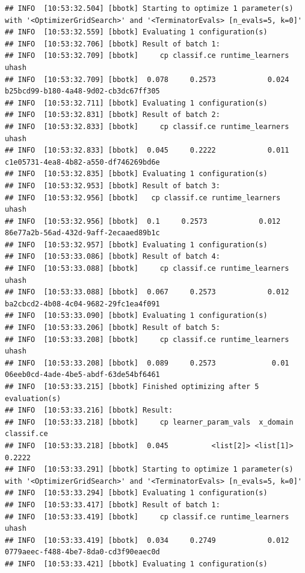 \documentclass[
]{scrbook}
\begin{document}
\begin{verbatim}
## INFO  [10:53:32.504] [bbotk] Starting to optimize 1 parameter(s) with '<OptimizerGridSearch>' and '<TerminatorEvals> [n_evals=5, k=0]' 
## INFO  [10:53:32.559] [bbotk] Evaluating 1 configuration(s) 
## INFO  [10:53:32.706] [bbotk] Result of batch 1: 
## INFO  [10:53:32.709] [bbotk]     cp classif.ce runtime_learners                                uhash 
## INFO  [10:53:32.709] [bbotk]  0.078     0.2573            0.024 b25bcd99-b180-4a48-9d02-cb3dc67ff305 
## INFO  [10:53:32.711] [bbotk] Evaluating 1 configuration(s) 
## INFO  [10:53:32.831] [bbotk] Result of batch 2: 
## INFO  [10:53:32.833] [bbotk]     cp classif.ce runtime_learners                                uhash 
## INFO  [10:53:32.833] [bbotk]  0.045     0.2222            0.011 c1e05731-4ea8-4b82-a550-df746269bd6e 
## INFO  [10:53:32.835] [bbotk] Evaluating 1 configuration(s) 
## INFO  [10:53:32.953] [bbotk] Result of batch 3: 
## INFO  [10:53:32.956] [bbotk]   cp classif.ce runtime_learners                                uhash 
## INFO  [10:53:32.956] [bbotk]  0.1     0.2573            0.012 86e77a2b-56ad-432d-9aff-2ecaaed89b1c 
## INFO  [10:53:32.957] [bbotk] Evaluating 1 configuration(s) 
## INFO  [10:53:33.086] [bbotk] Result of batch 4: 
## INFO  [10:53:33.088] [bbotk]     cp classif.ce runtime_learners                                uhash 
## INFO  [10:53:33.088] [bbotk]  0.067     0.2573            0.012 ba2cbcd2-4b08-4c04-9682-29fc1ea4f091 
## INFO  [10:53:33.090] [bbotk] Evaluating 1 configuration(s) 
## INFO  [10:53:33.206] [bbotk] Result of batch 5: 
## INFO  [10:53:33.208] [bbotk]     cp classif.ce runtime_learners                                uhash 
## INFO  [10:53:33.208] [bbotk]  0.089     0.2573             0.01 06eeb0cd-4ade-4be5-abdf-63de54bf6461 
## INFO  [10:53:33.215] [bbotk] Finished optimizing after 5 evaluation(s) 
## INFO  [10:53:33.216] [bbotk] Result: 
## INFO  [10:53:33.218] [bbotk]     cp learner_param_vals  x_domain classif.ce 
## INFO  [10:53:33.218] [bbotk]  0.045          <list[2]> <list[1]>     0.2222 
## INFO  [10:53:33.291] [bbotk] Starting to optimize 1 parameter(s) with '<OptimizerGridSearch>' and '<TerminatorEvals> [n_evals=5, k=0]' 
## INFO  [10:53:33.294] [bbotk] Evaluating 1 configuration(s) 
## INFO  [10:53:33.417] [bbotk] Result of batch 1: 
## INFO  [10:53:33.419] [bbotk]     cp classif.ce runtime_learners                                uhash 
## INFO  [10:53:33.419] [bbotk]  0.034     0.2749            0.012 0779aeec-f488-4be7-8da0-cd3f90eaec0d 
## INFO  [10:53:33.421] [bbotk] Evaluating 1 configuration(s) 

\end{verbatim}
\end{document}

